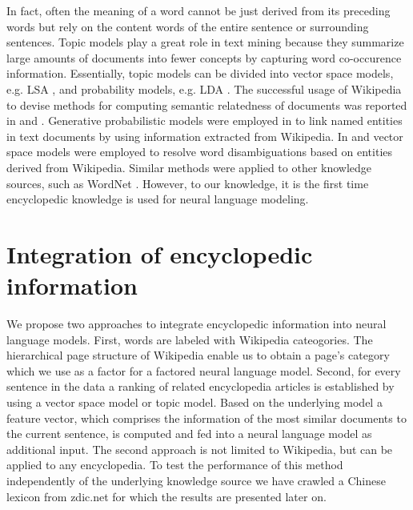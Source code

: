 \documentclass[a4paper]{article}
\begin{document}
In fact, often the meaning of a word cannot be just derived from its preceding words but rely on the content words of the entire sentence or surrounding sentences. 
Topic models play a great role in text mining because they summarize large amounts of documents into fewer concepts by capturing word co-occurence information. Essentially, topic models can be divided into vector space models, e.g. LSA \cite{deerwester1990indexing}, and probability models, e.g. LDA \cite{blei2003latent}. 
The successful usage of Wikipedia to devise methods for computing semantic relatedness of documents was reported in \cite{gabrilovich2007computing} and \cite{strube2006wikirelate}.
Generative probabilistic models were employed in \cite{han2012entity} to link named entities in text documents by using information extracted from Wikipedia. 
In \cite{cucerzan2007large} and \cite{bunescu2006using} vector space models were employed to resolve word disambiguations based on entities derived from Wikipedia.
Similar methods were applied to other knowledge sources, such as WordNet \cite{hearst1992automatic}.
However, to our knowledge, it is the first time encyclopedic knowledge is used for neural language modeling.

\section{Integration of encyclopedic information}
We propose two approaches to integrate encyclopedic information into neural language models.
First, words are labeled with Wikipedia cateogories. The hierarchical page structure of Wikipedia enable us to obtain a page's category which we use as a factor for a factored neural language model.
Second, for every sentence in the data a ranking of related encyclopedia articles is established by using a vector space model or topic model. Based on the underlying model a feature vector, which comprises the information of the most similar documents to the current sentence, is computed  and fed into a neural language model as additional input. The second approach is not limited to Wikipedia, but can be applied to any encyclopedia. To test the performance of this method independently of the underlying knowledge source we have crawled a Chinese lexicon from zdic.net \cite{zdic} for which the results are presented later on. 
\end{document}
